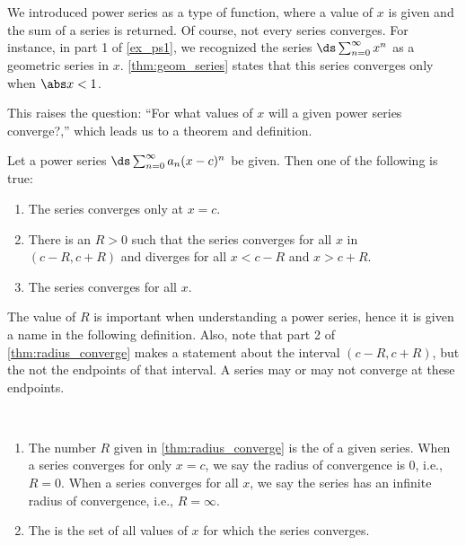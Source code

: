 We introduced power series as a type of function, where a value of $x$ is given and the sum of a series is returned. Of course, not every series converges. For instance, in part 1 of \autoref{ex_ps1}, we recognized the series $\ds \sum_{n=0}^\infty x^n$ as a geometric series in $x$. \autoref{thm:geom_series} states that this series converges only when $\abs x<1$. 

This raises the question: ``For what values of $x$ will a given power series converge?,'' which  leads us to a theorem and definition.

{Let a power series $\ds \sum_{n=0}^\infty a_n(x-c)^n$ be given. Then one of the following is true:
\begin{enumerate}
	\item The series converges only at $x=c$.
	\item	There is an $R>0$ such that the series converges for all $x$ in \\	
	$(c-R,c+R)$ and diverges for all $x<c-R$ and $x>c+R$.
	\item	The series converges for all $x$.
\end{enumerate}
}

	
The value of $R$ is important when understanding a power series, hence it is given a name in the following definition. Also, note that part 2 of \autoref{thm:radius_converge} makes a statement about the interval $(c-R,c+R)$, but the not the endpoints of that interval. A series may or may not converge at these endpoints.
	
{\mbox{}\\[-2\baselineskip]
\begin{enumerate}
	\item The number $R$ given in \autoref{thm:radius_converge} is the  of a given series. When a series converges for only $x=c$, we say the radius of convergence is 0, i.e.,  $R=0$. When a series converges for all $x$, we say the series has an infinite radius of convergence, i.e., $R=\infty$.
	\item	The  is the set of all values of $x$ for which the series converges.
\end{enumerate}}

